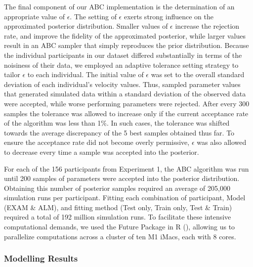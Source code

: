 \documentclass[
  11pt,
  letterpaper,
]{article}
\begin{document}
\begin{tcolorbox}[enhanced jigsaw, opacityback=0, left=2mm, colframe=quarto-callout-color-frame, toprule=.15mm, rightrule=.15mm, leftrule=.75mm, bottomrule=.15mm, arc=.35mm, breakable, colback=white]
The final component of our ABC implementation is the determination of an
appropriate value of \(\epsilon\). The setting of \(\epsilon\) exerts
strong influence on the approximated posterior distribution. Smaller
values of \(\epsilon\) increase the rejection rate, and improve the
fidelity of the approximated posterior, while larger values result in an
ABC sampler that simply reproduces the prior distribution. Because the
individual participants in our dataset differed substantially in terms
of the noisiness of their data, we employed an adaptive tolerance
setting strategy to tailor \(\epsilon\) to each individual. The initial
value of \(\epsilon\) was set to the overall standard deviation of each
individual's velocity values. Thus, sampled parameter values that
generated simulated data within a standard deviation of the observed
data were accepted, while worse performing parameters were rejected.
After every 300 samples the tolerance was allowed to increase only if
the current acceptance rate of the algorithm was less than 1\%. In such
cases, the tolerance was shifted towards the average discrepancy of the
5 best samples obtained thus far. To ensure the acceptance rate did not
become overly permissive, \(\epsilon\) was also allowed to decrease
every time a sample was accepted into the posterior.

\end{tcolorbox}

For each of the 156 participants from Experiment 1, the ABC algorithm
was run until 200 samples of parameters were accepted into the posterior
distribution. Obtaining this number of posterior samples required an
average of 205,000 simulation runs per participant. Fitting each
combination of participant, Model (EXAM \& ALM), and fitting method
(Test only, Train only, Test \& Train) required a total of 192 million
simulation runs. To facilitate these intensive computational demands, we
used the Future Package in R
(), allowing us to parallelize computations across a cluster of ten
M1 iMacs, each with 8 cores.

\subsubsection{Modelling Results}\label{modelling-results}

\begingroup
\fontsize{9.0pt}{10.8pt}\selectfont
\end{document}
